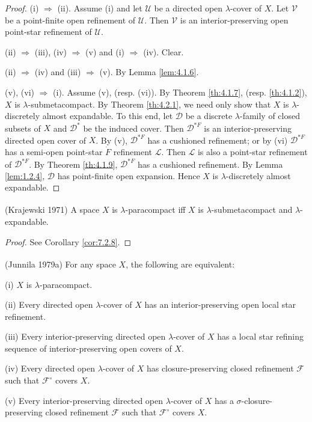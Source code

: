 \documentclass[ch4.tex]{subfiles}
\begin{document}
\begin{proof} 
(i) $\Rightarrow$ (ii). Assume (i) and let $\mathscr{U}$ be a directed open
$\lambda$-cover of $X$. Let $\mathscr{V}$ be a point-finite open refinement of
$\mathscr{U}$. Then $\mathscr{V}$ is an
interior-preserving open point-star refinement of $\mathscr{U}$.

(ii) $\Rightarrow$ (iii), (iv) $\Rightarrow$ (v) and (i) $\Rightarrow$ (iv). Clear.

(ii) $\Rightarrow$ (iv) and (iii) $\Rightarrow$ (v). By Lemma \ref{lem:4.1.6}.

(v), (vi) $\Rightarrow$ (i). Assume (v), (resp. (vi)). By Theorem \ref{th:4.1.7}, (resp. \ref{th:4.1.2}),
$X$ is $\lambda$-submetacompact. By Theorem \ref{th:4.2.1},
we need only show that $X$ is $\lambda$-discretely almost expandable. To this end, let 
$\mathscr{D}$ be a discrete $\lambda$-family of closed subsets of $X$ and
$\mathscr{D}^*$ be the induced cover. Then $\mathscr{D}^{*F}$ is
an interior-preserving directed open cover of $X$. By (v),
$\mathscr{D}^{*F}$ has a cushioned refinement; or by (vi) $\mathscr{D}^{*F}$ has a
semi-open point-star $\dot{F}$ refinement $\mathscr{L}$. 
Then $\mathscr{L}$ is also a point-star refinement of $\mathscr{D}^{*F}$. 
By Theorem \ref{th:4.1.9}, $\mathscr{D}^{*F}$ has a cushioned refinement. 
By Lemma \ref{lem:1.2.4}, $\mathscr{D}$ has
point-finite open expansion. Hence $X$ is $\lambda$-discretely almost expandable.
\end{proof} 

{\theorem{} \label{th:4.2.3}
\textup{(\hstretch{1.8}{[}Krajewski 1971\hstretch{1.8}{]}\textsuperscript{\cite{Krajewski}})}
A space $X$ is $\lambda$-paracompact
iff $X$ is $\lambda$-submetacompact
and $\lambda$-expandable.
}

\begin{proof}
See Corollary \ref{cor:7.2.8}.
\end{proof}

{\theorem{} \label{th:4.2.4}
\textup{(\hstretch{1.8}{[}Junnila 1979a\hstretch{1.8}{]}\textsuperscript{\cite{Junnila1979a}})}
For any space $X$, the following are equivalent:

\textup{(i)} $X$ is $\lambda$-paracompact.

\textup{(ii)}  Every directed open $\lambda$-cover of $X$ has an interior-preserving open
local star refinement.

\textup{(iii)} Every interior-preserving directed open $\lambda$-cover of $X$ has a local star 
refining sequence of interior-preserving open covers of $X$.

\textup{(iv)} Every directed open $\lambda$-cover of $X$ has closure-preserving closed
refinement $\mathscr{F}$ such that $\mathscr{F}^\circ$ covers $X$.

\textup{(v)} Every interior-preserving directed open $\lambda$-cover of $X$ has
a $\sigma$-closure-preserving  closed refinement $\mathscr{F}$ such that $\mathscr{F}^\circ$ covers $X$.
}
\end{document}
